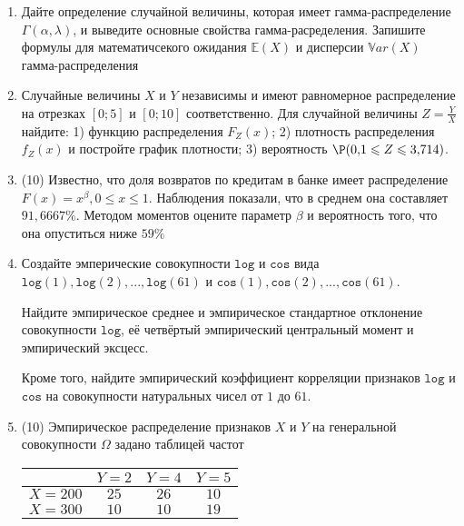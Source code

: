 \documentclass[a4paper,11pt]{article}
\begin{document}
\begin{enumerate}


\item

Дайте определение случайной величины, которая имеет гамма-распределение $\Gamma(\alpha,  \lambda)$, и выведите основные свойства гамма-расределения. Запишите формулы для математичсекого ожидания
$\mathbb{E}(X)$ и дисперсии $\mathbb{V}ar(X)$ гамма-распределения


\item



Случайные величины $X$ и $Y$ независимы и имеют равномерное
распределение на отрезках $[0;5]$ и $[0;10]$ соответственно. Для случайной величины $Z=\frac{Y}{X}$ найдите: 
1) функцию распределения $F_Z(x)$;
2) плотность распределения $f_Z(x)$ и постройте график плотности;
3) вероятность $\P(0,\!1\leqslant Z\leqslant 3,\!714)$.


\item

(10) Известно, что доля возвратов по кредитам в банке имеет распределение $F(x) = x ^{\beta}, 0 \leqslant x \leqslant 1$.
Наблюдения показали, что в среднем она составляет $91,6667\%$. Методом моментов оцените параметр $\beta$ и
вероятность того, что она опуститься ниже $59\%$


\item

    
    Создайте эмперические совокупности  $\mathtt{\text{log}}$ и $\mathtt{\text{cos}}$ вида $\mathtt{\text{log}}(1),\mathtt{\text{log}}(2), ..., \mathtt{\text{log}}(61) $ и $\mathtt{\text{cos}}(1),\mathtt{\text{cos}}(2), ..., \mathtt{\text{cos}}(61). $

    Найдите эмпирическое среднее и эмпирическое стандартное отклонение совокупности $\mathtt{\text{log}}$, её четвёртый эмпирический центральный момент и эмпирический эксцесс.

    Кроме того, найдите эмпирический коэффициент корреляции признаков $\mathtt{\text{log}}$ и $\mathtt{\text{cos}}$ на совокупности натуральных чисел от $1$ до $61$.
    

\item


(10) Эмпирическое распределение признаков $X$ и $Y$ на генеральной совокупности $\Omega$ задано таблицей частот  
 
\begin{tabular}{ | c | c | c | c | }
\hline
 & $Y = 2$ & $Y = 4$ & $Y = 5$  \\ \hline
$X = 200$ & $25$ & $26$ & $10$\\ \hline
$X = 300$ & $10$ & $10$ & $19$\\
\hline
\end{tabular}


\end{enumerate}
\end{document}
